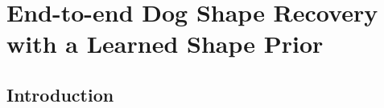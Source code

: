 \chapter{End-to-end Dog Shape Recovery with a Learned Shape Prior}\label{chap:wldo}

\ifpdf
    \graphicspath{{Chapter5/Figs/Raster/}{Chapter5/Figs/PDF/}{Chapter5/Figs/}}
\else
    \graphicspath{{Chapter5/Figs/Vector/}{Chapter5/Figs/}}
\fi





\section{Introduction}

